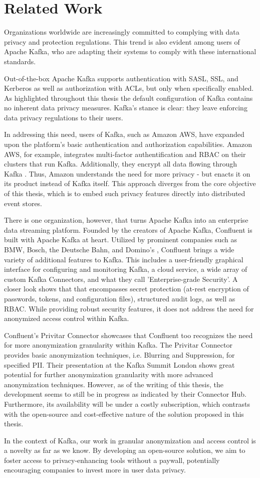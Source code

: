 \chapter{Related Work\label{cha:chapter6}}
Organizations worldwide are increasingly committed to complying with data privacy and protection regulations. This trend is also evident among users of Apache Kafka, who are adapting their systems to comply with these international standards. \par
Out-of-the-box Apache Kafka supports authentication with SASL, SSL, and Kerberos as well as authorization with \acp{ACL}, but only when specifically enabled. As highlighted throughout this thesis the default configuration of Kafka contains no inherent data privacy measures. Kafka's stance is clear: they leave enforcing data privacy regulations to their users. \par
In addressing this need, users of Kafka, such as Amazon AWS, have expanded upon the platform's basic authentication and authorization capabilities. Amazon AWS, for example, integrates multi-factor authentification and \ac{RBAC} on their clusters that run Kafka. Additionally, they encrypt all data flowing through Kafka \cite{aws_kafka_security}. Thus, Amazon understands the need for more privacy - but enacts it on its product instead of Kafka itself. This approach diverges from the core objective of this thesis, which is to embed such privacy features directly into distributed event stores. \par
There is one organization, however, that turns Apache Kafka into an enterprise data streaming platform. Founded by the creators of Apache Kafka, Confluent \cite{confluent} is built with Apache Kafka at heart. Utilized by prominent companies such as BMW, Bosch, the Deutsche Bahn, and Domino's \cite{confluent_customers}, Confluent brings a wide variety of additional features to Kafka. This includes a user-friendly graphical interface for configuring and monitoring Kafka, a cloud service, a wide array of custom Kafka Connectors, and what they call 'Enterprise-grade Security'. A closer look shows that that encompasses secret protection (at-rest encryption of passwords, tokens, and configuration files), structured audit logs, as well as \ac{RBAC}. While providing robust security features, it does not address the need for anonymized access control within Kafka. \par
Confluent's Privitar Connector \cite{privitar} showcases that Confluent too recognizes the need for more anonymization granularity within Kafka. The Privitar Connector provides basic anonymization techniques, i.e. Blurring and Suppression, for specified \ac{PII}. Their presentation at the Kafka Summit London \cite{confluent_privitar_summit} shows great potential for further anonymization granularity with more advanced anonymization techniques. However, as of the writing of this thesis, the development seems to still be in progress as indicated by their Connector Hub. Furthermore, its availability will be under a costly subscription, which contrasts with the open-source and cost-effective nature of the solution proposed in this thesis. \par
In the context of Kafka, our work in granular anonymization and access control is a novelty as far as we know. By developing an open-source solution, we aim to foster access to privacy-enhancing tools without a paywall, potentially encouraging companies to invest more in user data privacy.
